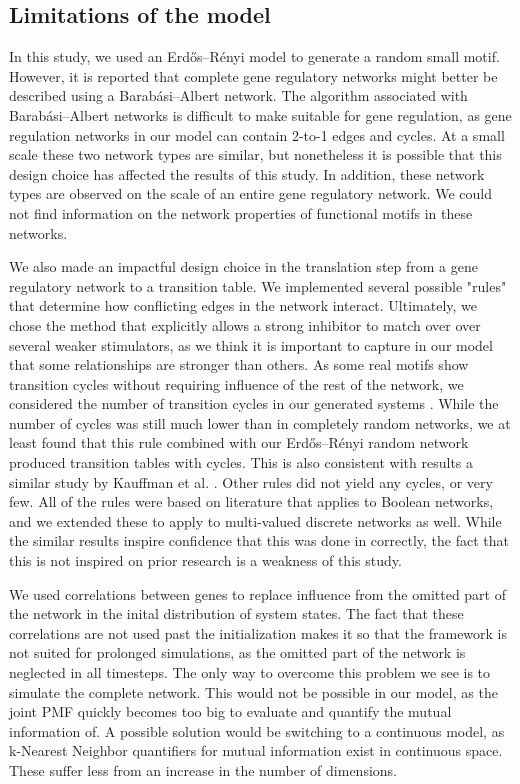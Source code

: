 \documentclass[../main.tex]{subfiles}
\begin{document}
\subsection{Limitations of the model}

In this study, we used an Erdős–Rényi model to generate a random small motif.
However, it is reported that complete gene regulatory networks might better be described using a Barabási–Albert network.
The algorithm associated with Barabási–Albert networks is difficult to make suitable for gene regulation, as gene regulation networks in our model can contain 2-to-1 edges and cycles.
At a small scale these two network types are similar, but nonetheless it is possible that this design choice has affected the results of this study.
In addition, these network types are observed on the scale of an entire gene regulatory network.
We could not find information on the network properties of functional motifs in these networks.

We also made an impactful design choice in the translation step from a gene regulatory network to a transition table.
We implemented several possible "rules" that determine how conflicting edges in the network interact.
Ultimately, we chose the method that explicitly allows a strong inhibitor to match over over several weaker stimulators, as we think it is important to capture in our model that some relationships are stronger than others.
As some real motifs show transition cycles without requiring influence of the rest of the network, we considered the number of transition cycles in our generated systems \cite{burda2011motifs}.
While the number of cycles was still much lower than in completely random networks, we at least found that this rule combined with our Erdős–Rényi random network produced transition tables with cycles.
This is also consistent with results a similar study by Kauffman et al. \cite{kauffman2003random}.
Other rules did not yield any cycles, or very few.
All of the rules were based on literature that applies to Boolean networks, and we extended these to apply to multi-valued discrete networks as well.
While the similar results inspire confidence that this was done in correctly, the fact that this is not inspired on prior research is a weakness of this study.

We used correlations between genes to replace influence from the omitted part of the network in the inital distribution of system states.
The fact that these correlations are not used past the initialization makes it so that the framework is not suited for prolonged simulations, as the omitted part of the network is neglected in all timesteps.
The only way to overcome this problem we see is to simulate the complete network.
This would not be possible in our model, as the joint PMF quickly becomes too big to evaluate and quantify the mutual information of.
A possible solution would be switching to a continuous model, as k-Nearest Neighbor quantifiers for mutual information exist in continuous space.
These suffer less from an increase in the number of dimensions.
\end{document}
